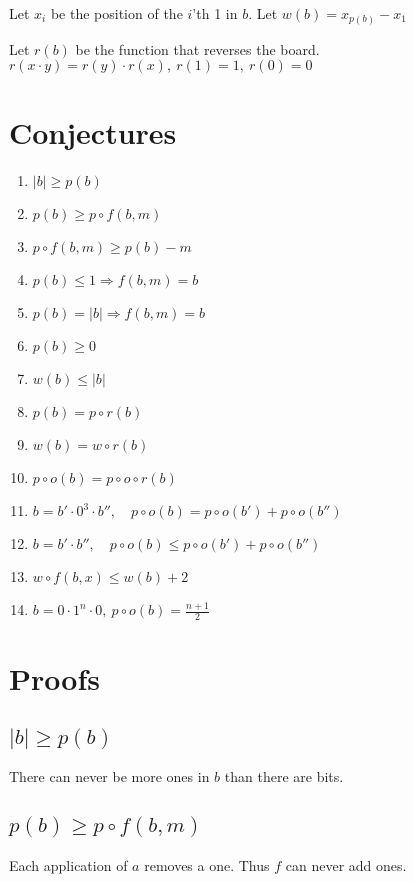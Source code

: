\documentclass{article}
\begin{document}
\vspace{\baselineskip}
\noindent
Let $x_i$ be the position of the $i$'th 1 in $b$. 
Let $w(b) = x_{p(b)}-x_1$

\vspace{\baselineskip}
\noindent
Let $r(b)$ be the function that reverses the board. $r(x\cdot y)=r(y) \cdot r(x),\ r(1) = 1,\ r(0) = 0$


\section{Conjectures}
\begin{enumerate}
    \item $|b|\ge p(b)$
    \item $p(b)\ge p\circ f(b,m)$
    \item $p\circ f(b,m)\ge p(b)-m$
    \item $p(b) \le 1 \Rightarrow f(b,m) = b$
    \item $p(b) = |b| \Rightarrow f(b,m) = b$
    \item $p(b)\ge 0$
    \item $w(b)\le |b|$ 
    \item $p(b) = p\circ r(b)$
    \item $w(b) = w\circ r(b)$
    \item $p\circ o(b) = p\circ o\circ r(b)$
    \item $b = b'\cdot 0^3\cdot b'',\quad p\circ o(b) = p\circ o(b') + p\circ o(b'')$
    \item $b = b'\cdot b'',\quad p\circ o(b) \le p\circ o(b') + p\circ o(b'')$
    \item $w\circ f(b,x)\le w(b)+2$ 
    \item $b=0\cdot 1^n\cdot 0,\ p\circ o(b) = \frac{n+1}{2}$ 
\end{enumerate}

\section{Proofs}
\subsection{$|b|\ge p(b)$}
There can never be more ones in $b$ than there are bits. 

\subsection{$p(b)\ge p\circ f(b,m)$}
Each application of $a$ removes a one. Thus $f$ can never add ones. 
\end{document}
